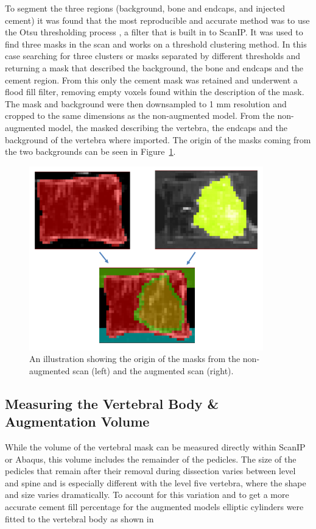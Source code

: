To segment the three regions (background, bone and endcaps, and injected cement) it was found that the most reproducible and accurate method was to use the Otsu thresholding process \cite{sezgin2004survey}, a filter that is built in to ScanIP.
It was used to find three masks in the scan and works on a threshold clustering method.
In this case searching for three clusters or masks separated by different thresholds and returning a mask that described the background, the bone and endcaps and the cement region.
From this only the cement mask was retained and underwent a flood fill filter, removing empty voxels found within the description of the mask.
The mask and background were then downsampled to 1 mm resolution and cropped to the same dimensions as the non-augmented model.
From the non-augmented model, the masked describing the vertebra, the endcaps and the background of the vertebra where imported.
The origin of the masks coming from the two backgrounds can be seen in Figure~\ref{fig:mask_demo}.

\begin{figure}[ht!]
  \centering
  \includegraphics[width=4in]{Chapters/Chapter_HT_images/mask_demo.png}
  \caption{An illustration showing the origin of the masks from the non-augmented scan (left) and the augmented scan (right).}
  \label{fig:mask_demo}
\end{figure}


\subsection{Measuring the Vertebral Body \& Augmentation Volume}

While the volume of the vertebral mask can be measured directly within ScanIP or Abaqus, this volume includes the remainder of the pedicles.
The size of the pedicles that remain after their removal during dissection varies between level and spine and is especially different with the level five vertebra, where the shape and size varies dramatically.
To account for this variation and to get a more accurate cement fill percentage for the augmented models elliptic cylinders were fitted to the vertebral body as shown in 

